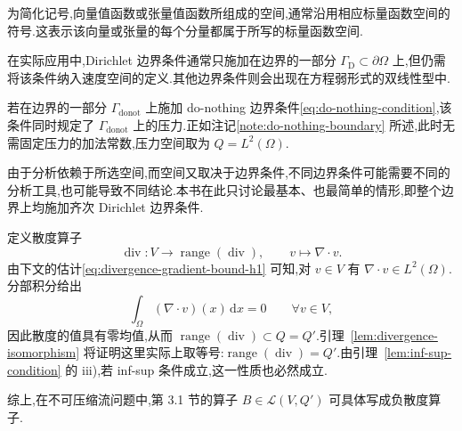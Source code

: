 \begin{note}[向量值函数与张量值函数空间的记法]\label{note:vector-tensor-space-notation}
为简化记号,向量值函数或张量值函数所组成的空间,通常沿用相应标量函数空间的符号.这表示该向量或张量的每个分量都属于所写的标量函数空间.
\end{note}

\begin{note}[其他边界条件下的函数空间]\label{note:other-boundary-condition-spaces}
在实际应用中,Dirichlet 边界条件通常只施加在边界的一部分 $\Gamma_{\mathrm D}\subset\partial\Omega$ 上,但仍需将该条件纳入速度空间的定义.其他边界条件则会出现在方程弱形式的双线性型中.

若在边界的一部分 $\Gamma_{\mathrm{donot}}$ 上施加 do-nothing 边界条件\cref{eq:do-nothing-condition},该条件同时规定了 $\Gamma_{\mathrm{donot}}$ 上的压力.正如注记\ref{note:do-nothing-boundary} 所述,此时无需固定压力的加法常数,压力空间取为 $Q=L^2(\Omega)$.

由于分析依赖于所选空间,而空间又取决于边界条件,不同边界条件可能需要不同的分析工具,也可能导致不同结论.本书在此只讨论最基本、也最简单的情形,即整个边界上均施加齐次 Dirichlet 边界条件.
\end{note}

\begin{note}[散度算子]\label{note:divergence-operator}
定义散度算子
\[
  \operatorname{div}:V\longrightarrow\operatorname{range}(\operatorname{div}),
  \qquad v\longmapsto\nabla\cdot v.
\]
由下文的估计\cref{eq:divergence-gradient-bound-h1} 可知,对 $v\in V$ 有 $\nabla\cdot v\in L^2(\Omega)$.分部积分给出
\[
  \int_\Omega (\nabla\cdot v)(x)\,\mathrm{d}x=0
  \qquad\forall v\in V,
\]
因此散度的值具有零均值,从而 $\operatorname{range}(\operatorname{div})\subset Q=Q'$.引理~\ref{lem:divergence-isomorphism} 将证明这里实际上取等号:$\operatorname{range}(\operatorname{div})=Q'$.由引理~\ref{lem:inf-sup-condition} 的 iii),若 inf-sup 条件成立,这一性质也必然成立.

综上,在不可压缩流问题中,第 3.1 节的算子 $B\in\mathcal{L}(V,Q')$ 可具体写成负散度算子.
\end{note}

